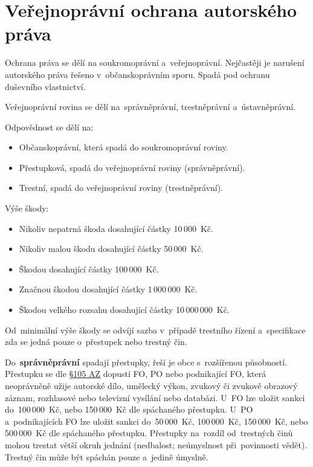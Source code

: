 \section{Veřejnoprávní ochrana autorského práva}

Ochrana práva se dělí na soukromoprávní a~veřejnoprávní. Nejčastěji je narušení autorského práva řešeno v~občanskoprávním sporu. Spadá pod ochranu duševního vlastnictví.

Veřejnoprávní rovina se dělí na~správněprávní, trestněprávní a~ústavněprávní.

Odpovědnost se dělí na:

\begin{itemize}
    \item Občanskoprávní, která spadá do soukromoprávní roviny.
    \item Přestupková, spadá do veřejnoprávní roviny (správněprávní).
    \item Trestní, spadá do veřejnoprávní roviny (trestněprávní).
\end{itemize}

Výše škody:

\begin{itemize}
    \item Nikoliv nepatrná škoda dosahující částky 10\,000~Kč.
    \item Nikoliv malou škodu dosahující částky 50\,000~Kč.
    \item Škodou dosahující částky 100\,000~Kč.
    \item Značnou škodou dosahující částky 1\,000\,000~Kč.
    \item Škodou velkého rozsahu dosahující částky 10\,000\,000~Kč.
\end{itemize}

Od~minimální výše škody se odvíjí sazba v~případě trestního řízení a~specifikace zda se jedná pouze o~přestupek nebo trestný čin.

Do~\textbf{správněprávní} spadají přestupky, řeší je obce s~rozšířenou působností. Přestupku se dle
\href{https://www.zakonyprolidi.cz/cs/2000-121#p105a-1-a}{§105 AZ} dopustí FO, PO nebo podnikající FO, která neoprávněně užije autorské dílo, umělecký výkon, zvukový či zvukově obrazový záznam, rozhlasové nebo televizní vysílání nebo databázi. U~FO lze uložit sankci do~100\,000~Kč, nebo 150\,000~Kč dle spáchaného přestupku. U~PO a~podnikajících FO lze uložit sankci do~50\,000~Kč, 100\,000~Kč, 150\,000~Kč, nebo 500\,000~Kč dle spáchaného přestupku. Přestupky na~rozdíl od~trestných činů mohou trestat větší okruh jednání (nedbalost; neúmyslnost při~povinnosti vědět). Trestný čin může být spáchán pouze a~jedině úmyslně.

